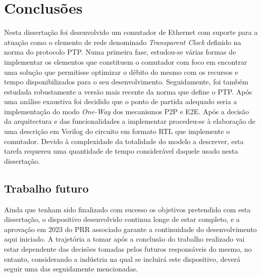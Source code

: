 \chapter{Conclusões}

Nesta dissertação foi desenvolvido um comutador de Ethernet com suporte para a atuação como o elemento de rede denominado \textit{Transparent Clock} definido na norma do protocolo PTP. Numa primeira fase, estudou-se várias formas de implementar os elementos que constituem o comutador com foco em encontrar uma solução que permitisse optimizar o débito do mesmo com os recursos e tempo disponibilizados para o seu desenvolvimento. Seguidamente, foi também estudada robustamente a versão mais recente da norma que define o PTP. Após uma análise exaustiva foi decidido que o ponto de partida adequado seria a implementação do modo \textit{One-Way} dos mecanismos P2P e E2E. Após a decisão da arquitectura e das funcionalidades a implementar procedeu-se à elaboração de uma descrição em Verilog do circuito em formato RTL que implemente o comutador. Devido à complexidade da totalidade do modelo a descrever, esta tarefa requereu uma quantidade de tempo considerável daquele usado nesta dissertação. 

\section{Trabalho futuro}

Ainda que tenham sido finalizado com sucesso os objetivos pretendido com esta dissertação, o dispositivo desenvolvido continua longe de estar completo, e a aprovação em 2023 do PRR associado garante a continuidade do desenvolvimento aqui iniciado. A trajetória a tomar após a conclusão do trabalho realizado vai estar dependente das decisões tomadas pelos futuros responsáveis do mesmo, no entanto, considerando a indústria na qual se incluirá este dispositivo, deverá seguir uma das seguidamente mencionadas. \par

